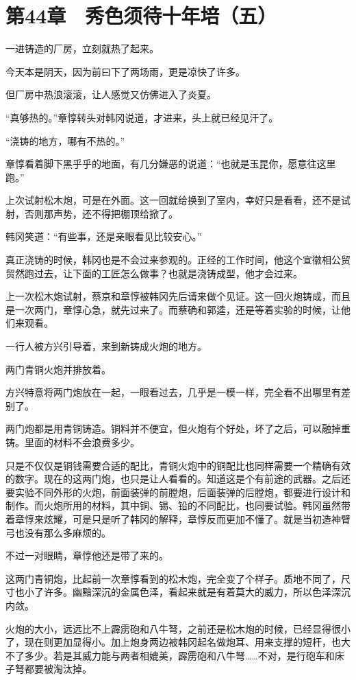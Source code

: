 \section{第44章　秀色须待十年培（五）}

 一进铸造的厂房，立刻就热了起来。

今天本是阴天，因为前曰下了两场雨，更是凉快了许多。

但厂房中热浪滚滚，让人感觉又仿佛进入了炎夏。

“真够热的。”章惇转头对韩冈说道，才进来，头上就已经见汗了。

“浇铸的地方，哪有不热的。”

章惇看着脚下黑乎乎的地面，有几分嫌恶的说道：“也就是玉昆你，愿意往这里跑。”

上次试射松木炮，可是在外面。这一回就给换到了室内，幸好只是看看，还不是试射，否则那声势，还不得把棚顶给掀了。

韩冈笑道：“有些事，还是亲眼看见比较安心。”

真正浇铸的时候，韩冈也是不会过来参观的。正经的工作时间，他这个宣徽相公贸贸然跑过去，让下面的工匠怎么做事？也就是浇铸成型，他才会过来。

上一次松木炮试射，蔡京和章惇被韩冈先后请来做个见证。这一回火炮铸成，而且是一次两门，章惇心急，就先过来了。而蔡确和郭逵，还是等着实验的时候，让他们来观看。

一行人被方兴引导着，来到新铸成火炮的地方。

两门青铜火炮并排放着。

方兴特意将两门炮放在一起，一眼看过去，几乎是一模一样，完全看不出哪里有差别了。

两门炮都是用青铜铸造。铜料并不便宜，但火炮有个好处，坏了之后，可以融掉重铸。里面的材料不会浪费多少。

只是不仅仅是铜钱需要合适的配比，青铜火炮中的铜配比也同样需要一个精确有效的数字。现在的这两门炮，也只是让人看看的。知道这是个有前途的武器。之后还要实验不同外形的火炮，前面装弹的前膛炮，后面装弹的后膛炮，都要进行设计和制作。而火炮所用的材料，其中铜、锡、铅的不同配比，也同要试验。韩冈虽然带着章惇来炫耀，可是只是听了韩冈的解释，章惇反而更加不懂了。就是当初造神臂弓也没有那么多麻烦的。

不过一对眼睛，章惇他还是带了来的。

这两门青铜炮，比起前一次章惇看到的松木炮，完全变了个样子。质地不同了，尺寸也小了许多。幽黯深沉的金属色泽，看起来就是有着莫大的威力，所以色泽深沉内敛。

火炮的大小，远远比不上霹雳砲和八牛弩，之前还是松木炮的时候，已经显得很小了，现在则更加显得小。加上炮身两边被韩冈起名做炮耳、用来支撑的短杆，也大不了多少。若是其威力能与两者相媲美，霹雳砲和八牛弩……不对，是行砲车和床子弩都要被淘汰掉。

